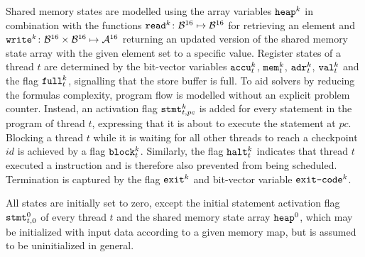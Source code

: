 Shared memory states are modelled using the array variables $\texttt{heap}^k$ in combination with the functions $\texttt{read}^k \colon \mathcal{B}^{16} \mapsto \mathcal{B}^{16}$ for retrieving an element and $\texttt{write}^k \colon \mathcal{B}^{16} \times \mathcal{B}^{16} \mapsto \mathcal{A}^{16}$ returning an updated version of the shared memory state array with the given element set to a specific value.
Register states of a thread $t$ are determined by the bit-vector variables $\texttt{accu}^k_t$, $\texttt{mem}^k_t$, $\texttt{adr}^k_t$, $\texttt{val}^k_t$ and the flag $\texttt{full}^k_t$, signalling that the store buffer is full.
To aid solvers by reducing the formulas complexity, program flow is modelled without an explicit problem counter.
Instead, an activation flag $\texttt{stmt}^k_{t, pc}$ is added for every statement in the program of thread $t$, expressing that it is about to execute the statement at $pc$.
Blocking a thread $t$ while it is waiting for all other threads to reach a checkpoint $id$ is achieved by a flag $\texttt{block}^k_t$.
Similarly, the flag $\texttt{halt}^k_t$ indicates that thread $t$ executed a  instruction and is therefore also prevented from being scheduled.
Termination is captured by the flag $\texttt{exit}^k$ and bit-vector variable $\texttt{exit-code}^k$.

All states are initially set to zero, except the initial statement activation flag $\texttt{stmt}^0_{t, 0}$ of every thread $t$ and the shared memory state array $\texttt{heap}^0$, which may be initialized with input data according to a given memory map, but is assumed to be uninitialized in general.

